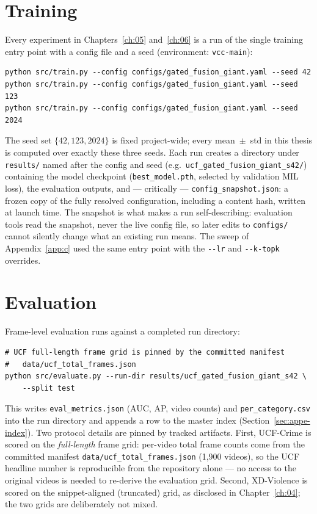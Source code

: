 \section{Training}
\label{sec:appe-train}

Every experiment in Chapters~\ref{ch:05} and~\ref{ch:06} is a run of the
single training entry point with a config file and a seed
(environment: \texttt{vcc-main}):

\begin{verbatim}
python src/train.py --config configs/gated_fusion_giant.yaml --seed 42
python src/train.py --config configs/gated_fusion_giant.yaml --seed 123
python src/train.py --config configs/gated_fusion_giant.yaml --seed 2024
\end{verbatim}

The seed set $\{42, 123, 2024\}$ is fixed project-wide; every mean~$\pm$~std
in this thesis is computed over exactly these three seeds. Each run creates a
directory under \texttt{results/} named after the config and seed (e.g.\
\texttt{ucf\_gated\_fusion\_giant\_s42/}) containing the model checkpoint
(\texttt{best\_model.pth}, selected by validation MIL loss), the evaluation
outputs, and --- critically --- \texttt{config\_snapshot.json}: a frozen copy
of the fully resolved configuration, including a content hash, written at
launch time. The snapshot is what makes a run self-describing: evaluation
tools read the snapshot, never the live config file, so later edits to
\texttt{configs/} cannot silently change what an existing run means. The
sweep of Appendix~\ref{app:c} used the same entry point with the
\texttt{-{}-lr} and \texttt{-{}-k-topk} overrides.

\section{Evaluation}
\label{sec:appe-eval}

Frame-level evaluation runs against a completed run directory:

\begin{verbatim}
# UCF full-length frame grid is pinned by the committed manifest
#   data/ucf_total_frames.json
python src/evaluate.py --run-dir results/ucf_gated_fusion_giant_s42 \
    --split test
\end{verbatim}

This writes \texttt{eval\_metrics.json} (AUC, AP, video counts) and
\texttt{per\_category.csv} into the run directory and appends a row to the
master index (Section~\ref{sec:appe-index}). Two protocol details are pinned
by tracked artifacts. First, UCF-Crime is scored on the \emph{full-length}
frame grid: per-video total frame counts come from the committed manifest
\texttt{data/ucf\_total\_frames.json} (1{,}900 videos), so the UCF headline
number is reproducible from the repository alone --- no access to the original
videos is needed to re-derive the evaluation grid. Second, XD-Violence is
scored on the snippet-aligned (truncated) grid, as disclosed in
Chapter~\ref{ch:04}; the two grids are deliberately not mixed.

